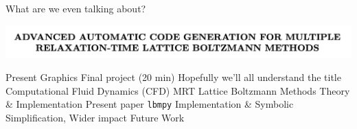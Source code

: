 \begin{frame}{What are we even talking about?}
  \begin{center}
    \includegraphics[width=0.8\linewidth]{title_header.png}
  \end{center}
  \begin{outline}
    \1 Present Graphics Final project (20 min)
    \2 Hopefully we'll all understand the title 
    \2 Computational Fluid Dynamics (CFD)
    \2 MRT Lattice Boltzmann Methods
    \3 Theory \& Implementation
    \1 Present paper
      \2 \lstinline{lbmpy}
      \2 Implementation \& Symbolic Simplification, 
      \2 Wider impact
    \1 Future Work
  \end{outline}
\end{frame}

